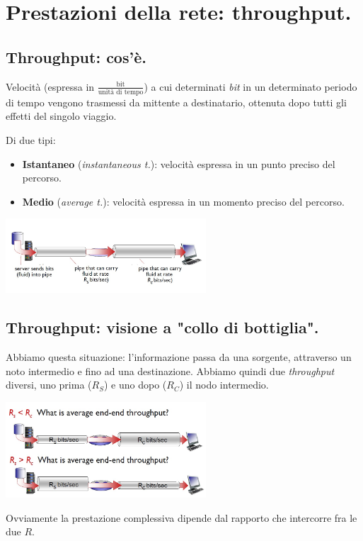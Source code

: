 \documentclass[10pt, a4paper, openany]{book}
\begin{document}
\section{Prestazioni della rete: throughput.}
\subsection{Throughput: cos'è.}
\noindent Velocità (espressa in $\frac{\text{bit}}{\text{unità di tempo}}$) a cui determinati \textit{bit} in un determinato periodo di tempo vengono trasmessi da mittente a destinatario, ottenuta dopo tutti gli effetti del singolo viaggio.

\noindent Di due tipi:
\begin{itemize}
    \item \textbf{Istantaneo} (\textit{instantaneous t.}): velocità espressa in un punto preciso del percorso.
    \item \textbf{Medio} (\textit{average t.}): velocità espressa in un momento preciso del percorso.
\end{itemize}

\begin{center}
    \includegraphics[width=75mm]{cap1 - Introduzione alle reti - 29.jpg}
\end{center}

\subsection{Throughput: visione a "collo di bottiglia".}
\noindent Abbiamo questa situazione: l'informazione passa da una sorgente, attraverso un noto intermedio e fino ad una destinazione. Abbiamo quindi due \textit{throughput} diversi, uno prima ($R_S$) e uno dopo ($R_C$) il nodo intermedio.
\begin{center}
    \includegraphics[width=75mm]{cap1 - Introduzione alle reti - 30.jpg}
\end{center}
\noindent Ovviamente la prestazione complessiva dipende dal rapporto che intercorre fra le due $R$.
\end{document}
